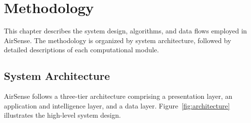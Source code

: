 \documentclass[12pt,a4paper]{report}
\begin{document}
\chapter{Methodology}

This chapter describes the system design, algorithms, and data flows employed in AirSense. The methodology is organized by system architecture, followed by detailed descriptions of each computational module.

\section{System Architecture}

AirSense follows a three-tier architecture comprising a presentation layer, an application and intelligence layer, and a data layer. Figure~\ref{fig:architecture} illustrates the high-level system design.
\end{document}

